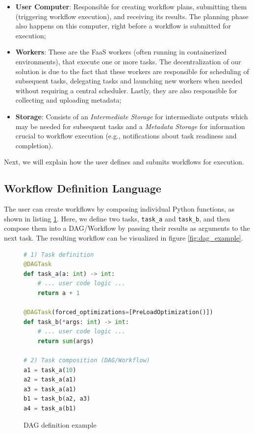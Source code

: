 \documentclass[conference]{IEEEtran}
\begin{document}
\begin{itemize}
    \item \textbf{User Computer}: Responsible for creating workflow plans, submitting them (triggering workflow execution), and receiving its results. The planning phase also happens on this computer, right before a workflow is submitted for execution;
    \item \textbf{Workers}: These are the FaaS workers (often running in containerized environments), that execute one or more tasks. The decentralization of our solution is due to the fact that these workers are responsible for scheduling of subsequent tasks, delegating tasks and launching new workers when needed without requiring a central scheduler. Lastly, they are also responsible for collecting and uploading metadata;
    \item \textbf{Storage}: Consists of an \textit{Intermediate Storage} for intermediate outputs which may be needed for subsequent tasks and a \textit{Metadata Storage} for information crucial to workflow execution (e.g., notifications about task readiness and completion).
\end{itemize}

Next, we will explain how the user defines and submits workflows for execution.

\subsection{Workflow Definition Language}

The user can create workflows by composing individual Python functions, as shown in listing \ref{lst:dag_lang_example}. Here, we define two tasks, \texttt{task\_a} and \texttt{task\_b}, and then compose them into a DAG/Workflow by passing their results as arguments to the next task. The resulting workflow can be visualized in figure \ref{fig:dag_example}.

\begin{figure}[h]
\centering
\begin{lstlisting}[language=Python, basicstyle=\ttfamily\footnotesize, columns=fullflexible, breaklines=true]
# 1) Task definition
@DAGTask
def task_a(a: int) -> int:
    # ... user code logic ...
    return a + 1

@DAGTask(forced_optimizations=[PreLoadOptimization()])
def task_b(*args: int) -> int:
    # ... user code logic ...
    return sum(args)

# 2) Task composition (DAG/Workflow)
a1 = task_a(10)
a2 = task_a(a1)
a3 = task_a(a1)
b1 = task_b(a2, a3)
a4 = task_a(b1)
\end{lstlisting}
\caption{DAG definition example}
\label{lst:dag_lang_example}
\end{figure}
\end{document}
